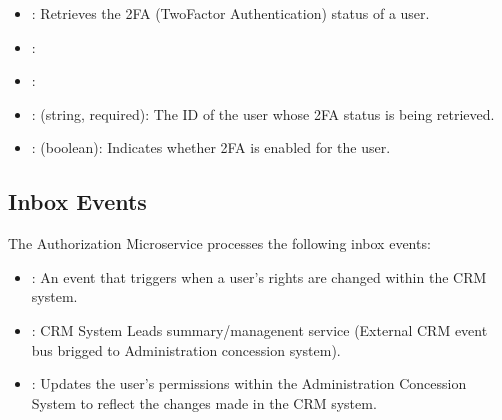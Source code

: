 \documentclass[letterpaper,10pt,english]{sphinxmanual}
\begin{document}
\sphinxAtStartPar
{}
\begin{itemize}
\item {} 
\sphinxAtStartPar
{}: Retrieves the 2FA (Two\sphinxhyphen{}Factor Authentication) status of a user.

\item {} 
\sphinxAtStartPar
{}: 

\item {} 
\sphinxAtStartPar
{}: 

\item {} 
\sphinxAtStartPar
{}:
\sphinxhyphen{}  (string, required): The ID of the user whose 2FA status is being retrieved.

\item {} 
\sphinxAtStartPar
{}:
\sphinxhyphen{}  (boolean): Indicates whether 2FA is enabled for the user.

\end{itemize}


\subsection{Inbox Events}
\label{\detokenize{administration_concession_system/authorization_service:inbox-events}}
\sphinxAtStartPar
The Authorization Microservice processes the following inbox events:

\sphinxAtStartPar
{}
\begin{itemize}
\item {} 
\sphinxAtStartPar
{}: An event that triggers when a user’s rights are changed within the CRM system.

\item {} 
\sphinxAtStartPar
{}: CRM System \textendash{} Leads summary/managenent service (External CRM event bus brigged to Administration concession system).

\item {} 
\sphinxAtStartPar
{}: Updates the user’s permissions within the Administration Concession System to reflect the changes made in the CRM system.

\end{itemize}
\end{document}
